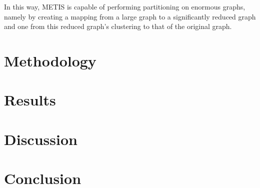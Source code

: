 \documentclass[journal]{IEEEtran}
\begin{document}
In this way, METIS is capable of performing partitioning on enormous graphs, namely by creating a mapping from a large graph to a significantly reduced graph and one from this reduced graph's clustering to that of the original graph. 

\section{Methodology}\label{methodology}


\section{Results}\label{results}

\section{Discussion}\label{discussion}

\section{Conclusion}\label{conclusion}
\end{document}
